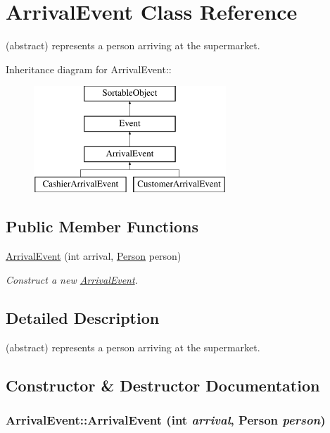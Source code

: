 \hypertarget{class_arrival_event}{
\section{ArrivalEvent Class Reference}
\label{class_arrival_event}
}
(abstract) represents a person arriving at the supermarket.  


Inheritance diagram for ArrivalEvent::\begin{figure}[H]
\begin{center}
\leavevmode
\includegraphics[height=4cm]{class_arrival_event}
\end{center}
\end{figure}
\subsection*{Public Member Functions}
\begin{CompactItemize}
\item 
\hyperlink{class_arrival_event_7ac8d4bf6cb612c89770837d7e73693c}{ArrivalEvent} (int arrival, \hyperlink{class_person}{Person} person)
\begin{CompactList}\small\item\em Construct a new \hyperlink{class_arrival_event}{ArrivalEvent}. \item\end{CompactList}\end{CompactItemize}


\subsection{Detailed Description}
(abstract) represents a person arriving at the supermarket. 

\subsection{Constructor \& Destructor Documentation}
\hypertarget{class_arrival_event_7ac8d4bf6cb612c89770837d7e73693c}{
\subsubsection[{ArrivalEvent}]{\setlength{\rightskip}{0pt plus 5cm}ArrivalEvent::ArrivalEvent (int {\em arrival}, \/  {\bf Person} {\em person})}}
\label{class_arrival_event_7ac8d4bf6cb612c89770837d7e73693c}


